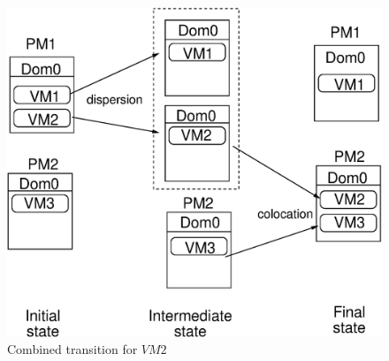 \begin{figure}[t]
	\centering
	\includegraphics[scale=0.45]{jss-figures/new-forward-plus-rev.eps}
	\caption{Combined transition for $VM2$}
	\label{fig:forward-plus-reverse}
\end{figure}

